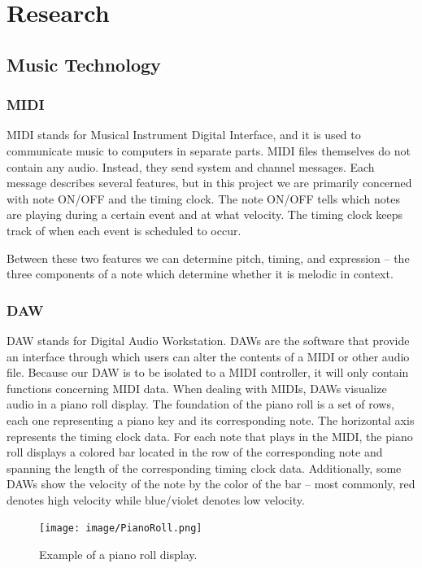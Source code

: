 \section{Research}

\subsection{Music Technology}

\subsubsection{MIDI}

MIDI stands for Musical Instrument Digital Interface, and it is used to communicate music
to computers in separate parts. MIDI files themselves do not contain any audio. Instead,
they send system and channel messages. Each message describes several features, but in
this project we are primarily concerned with note ON/OFF and the timing clock. The note
ON/OFF tells which notes are playing during a certain event and at what velocity. The
timing clock keeps track of when each event is scheduled to occur.

Between these two features we can determine pitch, timing, and expression -- the three
components of a note which determine whether it is melodic in context.

\subsubsection{DAW}
\label{sec:daw}

DAW stands for Digital Audio Workstation. DAWs are the software that provide an interface
through which users can alter the contents of a MIDI or other audio file. Because our DAW
is to be isolated to a MIDI controller, it  will only contain functions concerning MIDI
data. When dealing with MIDIs, DAWs visualize audio in a piano roll display. The
foundation of the piano roll is a set of rows, each one representing a piano key and its
corresponding note. The horizontal axis represents the timing clock data. For each note
that plays in the MIDI, the piano roll displays a colored bar located in the row of the
corresponding note and spanning the length of the corresponding timing clock data.
Additionally, some DAWs show the velocity of the note by the color of the bar -- most
commonly, red denotes high velocity while blue/violet denotes low velocity.

\begin{figure}[h!]
  \centering
  \texttt{[image: image/PianoRoll.png]}
  \caption{Example of a piano roll display.}
  \label{fig:piano_roll}
\end{figure}

